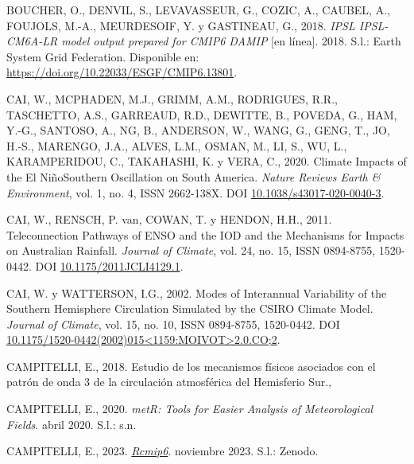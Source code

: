 \documentclass[12pt,oneside,a4paper]{reedthesis}
\newlength{\cslhangindent}
\newenvironment{CSLReferences}[2] %
 {%
  \setlength{\parindent}{0pt}
  \ifodd #1 \everypar{\setlength{\hangindent}{\cslhangindent}}\ignorespaces\fi
  \ifnum #2 > 0
  \setlength{\parskip}{#2\baselineskip}
  \fi
 }%
 {}
\begin{document}
\begin{CSLReferences}{1}{0}
\leavevmode{}%
BOUCHER, O., DENVIL, S., LEVAVASSEUR, G., COZIC, A., CAUBEL, A., FOUJOLS, M.-A., MEURDESOIF, Y. y GASTINEAU, G., 2018. \emph{IPSL IPSL-CM6A-LR model output prepared for CMIP6 DAMIP} {[}en línea{]}. 2018. S.l.: Earth System Grid Federation. Disponible en: \url{https://doi.org/10.22033/ESGF/CMIP6.13801}.

\leavevmode{}%
CAI, W., MCPHADEN, M.J., GRIMM, A.M., RODRIGUES, R.R., TASCHETTO, A.S., GARREAUD, R.D., DEWITTE, B., POVEDA, G., HAM, Y.-G., SANTOSO, A., NG, B., ANDERSON, W., WANG, G., GENG, T., JO, H.-S., MARENGO, J.A., ALVES, L.M., OSMAN, M., LI, S., WU, L., KARAMPERIDOU, C., TAKAHASHI, K. y VERA, C., 2020. Climate Impacts of the {El Ni{ñ}o}{\textendash}{Southern Oscillation} on {South America}. \emph{Nature Reviews Earth \& Environment}, vol. 1, no. 4, ISSN 2662-138X. DOI \href{https://doi.org/10.1038/s43017-020-0040-3}{10.1038/s43017-020-0040-3}.

\leavevmode{}%
CAI, W., RENSCH, P. van, COWAN, T. y HENDON, H.H., 2011. Teleconnection {Pathways} of {ENSO} and the {IOD} and the {Mechanisms} for {Impacts} on {Australian Rainfall}. \emph{Journal of Climate}, vol. 24, no. 15, ISSN 0894-8755, 1520-0442. DOI \href{https://doi.org/10.1175/2011JCLI4129.1}{10.1175/2011JCLI4129.1}.

\leavevmode{}%
CAI, W. y WATTERSON, I.G., 2002. Modes of {Interannual Variability} of the {Southern Hemisphere Circulation Simulated} by the {CSIRO Climate Model}. \emph{Journal of Climate}, vol. 15, no. 10, ISSN 0894-8755, 1520-0442. DOI \href{https://doi.org/10.1175/1520-0442(2002)015\%3C1159:MOIVOT\%3E2.0.CO;2}{10.1175/1520-0442(2002)015\textless1159:MOIVOT\textgreater2.0.CO;2}.

\leavevmode{}%
CAMPITELLI, E., 2018. {Estudio de los mecanismos f{í}sicos asociados con el patr{ó}n de onda 3 de la circulaci{ó}n atmosf{é}rica del Hemisferio Sur}.,

\leavevmode{}%
CAMPITELLI, E., 2020. \emph{{metR}: {Tools} for {Easier Analysis} of {Meteorological Fields}}. abril 2020. S.l.: s.n.

\leavevmode{}%
CAMPITELLI, E., 2023. \emph{\href{https://doi.org/10.5281/zenodo.10138834}{Rcmip6}}. noviembre 2023. S.l.: Zenodo.


\end{CSLReferences}
\end{document}

